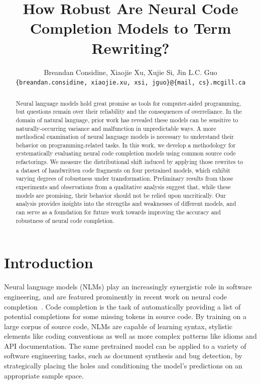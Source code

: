 \documentclass[usenames,dvipsnames]{article} %
\title{How Robust Are Neural Code Completion Models to Term Rewriting?}
\author{Breandan Considine, Xiaojie Xu, Xujie Si, Jin L.C. Guo\\
\texttt{\{breandan.considine, xiaojie.xu, xsi, jguo\}@\{mail, cs\}.mcgill.ca}\\
}
\begin{document}
  \maketitle

  \begin{abstract}
    Neural language models hold great promise as tools for computer-aided programming, but questions remain over their reliability and the consequences of overreliance. In the domain of natural language, prior work has revealed these models can be sensitive to naturally-occurring variance and malfunction in unpredictable ways. A more methodical examination of neural language models is necessary to understand their behavior on programming-related tasks. In this work, we develop a methodology for systematically evaluating neural code completion models using common source code refactorings. We measure the distributional shift induced by applying those rewrites to a dataset of handwritten code fragments on four pretrained models, which exhibit varying degrees of robustness under transformation. Preliminary results from those experiments and observations from a qualitative analysis suggest that, while these models are promising, their behavior should not be relied upon uncritically. Our analysis provides insights into the strengths and weaknesses of different models, and can serve as a foundation for future work towards improving the accuracy and robustness of neural code completion.
  \end{abstract}

  \section{Introduction}\label{sec:introduction}

  Neural language models (NLMs) play an increasingly synergistic role in software engineering, and are featured prominently in recent work on neural code completion~\citep{chen2021evaluating}. Code completion is the task of automatically providing a list of potential completions for some missing tokens in source code. By training on a large corpus of source code, NLMs are capable of learning syntax, stylistic elements like coding conventions as well as more complex patterns like idioms and API documentation. The same pretrained model can be applied to a variety of software engineering tasks, such as document synthesis and bug detection, by strategically placing the holes and conditioning the model's predictions on an appropriate sample space.
\end{document}
